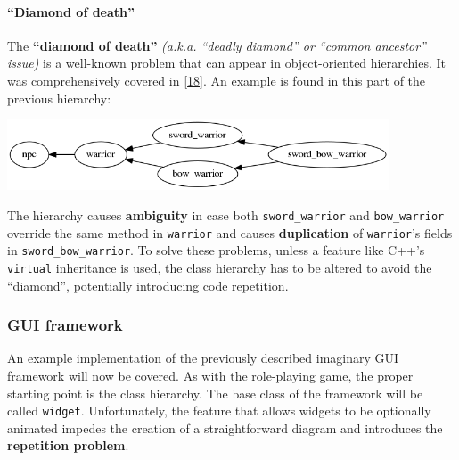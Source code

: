 \documentclass[oneside, 12pt, a4paper, openany]{book}
\let\origfigure=\figure
\let\endorigfigure=\endfigure
\renewenvironment{figure}[1][]{%
\origfigure[H]
}{%
\endorigfigure
}
\begin{document}
\paragraph{\texorpdfstring{``Diamond of
death''}{Diamond of death}}\label{diamond-of-death}

The \textbf{``diamond of death''} \emph{(a.k.a. ``deadly diamond'' or
``common ancestor'' issue)} is a well-known problem that can appear in
object-oriented hierarchies. It was comprehensively covered in
{[}\protect\hyperlink{ref-truyen2004generalization}{18}{]}. An example
is found in this part of the previous hierarchy:

\begin{figure}
\centering
\includegraphics[width=0.85000\textwidth]{source/figures/generated/ecs/overview/oop/diamond_of_death.png}
\caption{OOP encoding issue: ``diamond of death''}
\end{figure}

The hierarchy causes \textbf{ambiguity} in case both
\texttt{sword_warrior}
and
\texttt{bow_warrior}
override the same method in
\texttt{warrior}
and causes \textbf{duplication} of
\texttt{warrior}'s
fields in
\texttt{sword_bow_warrior}.
To solve these problems, unless a feature like C++'s
\texttt{virtual}
inheritance is used, the class hierarchy has to be altered to avoid the
``diamond'', potentially introducing code repetition.

\subsubsection{GUI framework}\label{gui-framework-1}

An example implementation of the previously described imaginary GUI
framework will now be covered. As with the role-playing game, the proper
starting point is the class hierarchy. The base class of the framework
will be called
\texttt{widget}.
Unfortunately, the feature that allows widgets to be optionally animated
impedes the creation of a straightforward diagram and introduces the
\textbf{repetition problem}.
\end{document}
